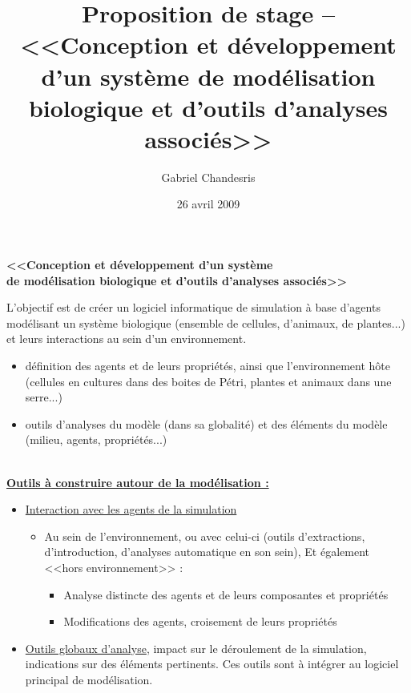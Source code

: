 \documentclass[11pt,twoside,a4paper]{article}
\author{Gabriel Chandesris}
\title{Proposition de stage -- <<Conception et d{\'e}veloppement d'un syst{\`e}me de mod{\'e}lisation biologique et d'outils d'analyses associ{\'e}s>>}
\date{26 avril 2009}
\begin{document}
\begin{center}
\textbf{<<Conception et d{\'e}veloppement d'un syst{\`e}me~\\ de mod{\'e}lisation biologique et d'outils d'analyses associ{\'e}s>>}
\end{center}

L'objectif est de cr{\'e}er un logiciel informatique de simulation {\`a} base d'agents mod{\'e}lisant un syst{\`e}me biologique (ensemble de cellules, d'animaux, de plantes...) et leurs interactions au  sein d'un environnement.
\begin{itemize}
	\item d{\'e}finition des agents et de leurs propri{\'e}t{\'e}s, ainsi que l'environnement h{\^o}te (cellules en cultures dans des boites de P{\'e}tri, plantes et animaux dans une serre...)  
	\item outils d'analyses du mod{\`e}le (dans sa globalit{\'e}) et des {\'e}l{\'e}ments du mod{\`e}le (milieu, agents, propri{\'e}t{\'e}s...)
\end{itemize}~\\

\textbf{\underline{Outils {\`a} construire autour de la mod{\'e}lisation : }}
\begin{itemize}
	\item[ ] \underline{Interaction avec les agents de la simulation}
	\begin{itemize}
		\item[ ] Au sein de l'environnement, ou avec celui-ci (outils d'extractions,  d'introduction, d'analyses automatique en son sein), Et {\'e}galement <<hors environnement>> :
		\begin{itemize}
			\item[ ] Analyse distincte des agents et de leurs composantes et propri{\'e}t{\'e}s
			\item[ ] Modifications des agents, croisement de leurs propri{\'e}t{\'e}s
		\end{itemize}
	\end{itemize}
	\item[ ] \underline{Outils globaux d'analyse}, impact sur le d{\'e}roulement de la simulation, indications sur des {\'e}l{\'e}ments pertinents. Ces outils sont {\`a} int{\'e}grer au logiciel principal de mod{\'e}lisation.
\end{itemize}~\\
\end{document}
